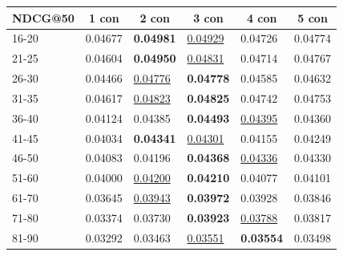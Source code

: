 \begin{table}[]
    \centering
    \begin{tabular}{|l|l|l|l|l|l|}
        \hline
        NDCG@50 & \multicolumn{1}{c|}{1 con} & \multicolumn{1}{c|}{2 con} & \multicolumn{1}{c|}{3 con} & \multicolumn{1}{c|}{4 con} & \multicolumn{1}{c|}{5 con} \\ \hline
        16-20   & 0.04677                    & \textbf{0.04981}           & \underline{0.04929}        & 0.04726                    & 0.04774                    \\ \hline
        21-25   & 0.04604                    & \textbf{0.04950}           & \underline{0.04831}        & 0.04714                    & 0.04767                    \\ \hline
        26-30   & 0.04466                    & \underline{0.04776}        & \textbf{0.04778}           & 0.04585                    & 0.04632                    \\ \hline
        31-35   & 0.04617                    & \underline{0.04823}        & \textbf{0.04825}           & 0.04742                    & 0.04753                    \\ \hline
        36-40   & 0.04124                    & 0.04385                    & \textbf{0.04493}           & \underline{0.04395}        & 0.04360                    \\ \hline
        41-45   & 0.04034                    & \textbf{0.04341}           & \underline{0.04301}        & 0.04155                    & 0.04249                    \\ \hline
        46-50   & 0.04083                    & 0.04196                    & \textbf{0.04368}           & \underline{0.04336}        & 0.04330                    \\ \hline
        51-60   & 0.04000                    & \underline{0.04200}        & \textbf{0.04210}           & 0.04077                    & 0.04101                    \\ \hline
        61-70   & 0.03645                    & \underline{0.03943}        & \textbf{0.03972}           & 0.03928                    & 0.03846                    \\ \hline
        71-80   & 0.03374                    & 0.03730                    & \textbf{0.03923}           & \underline{0.03788}        & 0.03817                    \\ \hline
        81-90   & 0.03292                    & 0.03463                    & \underline{0.03551}        & \textbf{0.03554}           & 0.03498                    \\ \hline

\end{tabular}
\end{table}
